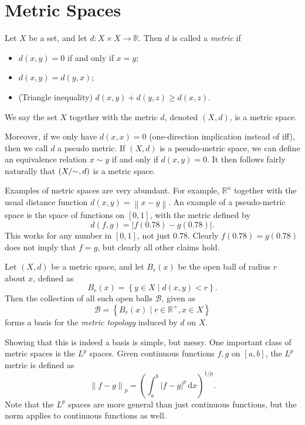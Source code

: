 \chapter{Metric Spaces}
\begin{definition}[Metric]\label{dfn:3.1}
	Let $X$ be a set, and let $d : X\times X \to \mathbb{R} $. Then $d$ is called a \emph{metric} if
	\begin{itemize}
		\item $d(x,y)=0$ if and only if $x=y$;
		\item $d(x,y)=d(y,x)$;
		\item (Triangle inequality) $d(x,y)+d(y,z)\geq d(x,z)$.
	\end{itemize}
	We say the set $X$ together with the metric $d$, denoted $(X,d)$, is a metric space.
\end{definition}

Moreover, if we only have $d(x,x)=0$ (one-direction implication instead of iff), then we call $d$ a pseudo metric. If $(X,d)$ is a pseudo-metric space, we can define an equivalence relation $x\sim y$ if and only if $d(x,y)=0$. It then follows fairly naturally that $(X/\mathbin{\sim},d)$ is a metric space.

Examples of metric spaces are very abundant. For example, $\mathbb{R} ^n$ together with the usual distance function $d(x,y)=\left\| x-y \right\| $. An example of a pseudo-metric space is the space of functions on $[0,1]$, with the metric defined by
\[
	d(f,g)=\left| f(0.78)-g(0.78) \right| 
.\]
This works for any number in $[0,1]$, not just $0.78$. Clearly $f(0.78)=g(0.78)$ does not imply that $f=g$, but clearly all other claims hold.

\begin{definition}\label{dfn:3.2}
	Let $(X,d)$ be a metric space, and let $B_r\left( x \right) $ be the open ball of radius $r$ about $x$, defined as
	\[
		B_r(x)=\left\{ y\in X\mid d(x,y)<r \right\} 
	.\]
	Then the collection of all such open balls $\mathcal{B} $, given as
	\[
		\mathcal{B} =\left\{ B_r(x)\mid r\in\mathbb{R} ^+,x\in X \right\} 
	\]
	forms a basis for the \emph{metric topology} induced by $d$ on $X$.
\end{definition}

Showing that this is indeed a basis is simple, but messy. One important class of metric spaces is the $L^p$ spaces. Given continuous functions $f,g$ on $[a,b]$, the $L^p$ metric is defined as
\[
	\left\| f-g \right\|_p = \left(\int_{a}^{b} \left| f-g \right|^p \,\mathrm{d} x\right)^{1/p} 
.\]
Note that the $L^p$ spaces are more general than just continuous functions, but the norm applies to continuous functions as well.


